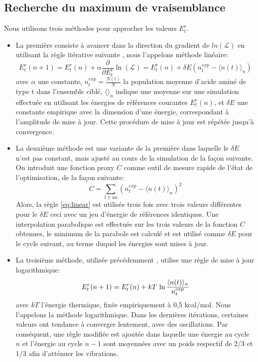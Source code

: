 \subsection{Recherche du maximum de vraisemblance}
Nous utilisons trois méthodes pour approcher les valeurs ${E^r_t}$.
\begin{itemize}
  \label{enumMeth}
\item La première consiste à avancer dans la direction du gradient de $ln(\mathcal{L})$ en utilisant la règle itérative suivante \cite{Kleinman06}, nous l'appelons méthode linéaire:
\begin{equation} \label {eq:linear}
  E^r_t(n+1) = E^r_t(n) + \alpha \frac{\partial}{\partial E^r_t} \ln(\mathcal{L})=E^r_t(n) + \delta E (n^{exp}_t - \langle n(t)\rangle_n)
\end{equation} 
avec $\alpha$ une constante, $n^{exp}_t = \frac{N(t)}{N}$ la population moyenne d'acide aminé de type t dans l'ensemble ciblé, $\langle\rangle_n$ indique une moyenne sur une simulation effectuée en utilisant les énergies de références courantes ${E^r_t(n)}$, et $\delta E$ une constante empirique avec la dimension d'une énergie, correspondant à l'amplitude de mise à jour. Cette procédure de mise à jour est répétée jusqu'à convergence.
\item La deuxième méthode est une variante de la première dans laquelle le $\delta E$ n'est pas constant, mais ajusté au cours de la simulation de la façon suivante. On introduit une fonction proxy $C$ comme outil de mesure rapide de l'état de l'optimisation, de la façon suivante:
\begin{equation} \label {eq:proxy_function}
C =\sum_{t \in aa}(n^{exp}_t - \langle n(t)\rangle_n )^2
\end{equation} 
Alors, la règle \ref{eq:linear} est utilisée trois fois avec trois valeurs différentes pour le $\delta E$ ceci avec un jeu d'énergie de références identiques. Une interpolation parabolique est effectuée sur les trois valeurs de la fonction $C$ obtenues, le minimum de la parabole est calculé et est utilisé comme $\delta E$ pour le cycle suivant, au terme duquel les énergies sont mises à jour.
\item La troisième méthode, utilisée précédemment \cite{Schmidt08, Simonson13b}, utilise une règle de mise à jour logarithmique:
\begin{equation} \label{eq:log}
E^r_t (n+1) = E^r_t (n) + kT \, \ln \frac{\langle n(t) \rangle_n}{n_t^{\rm exp}}
\end{equation}
avec $kT$ l'énergie thermique, fixée empiriquement à 0,5 kcal/mol. Nous l'appelons la méthode logarithmique. Dans les dernières itérations, certaines valeurs ont tendance à converger lentement, avec des oscillations. Par conséquent, une règle modifiée est ajoutée dans laquelle une énergie au cycle $n$ et l'énergie au cycle  $n-1$ sont moyennées avec un poids respectif de 2/3 et 1/3 afin d'atténuer les vibrations.

\end{itemize}


